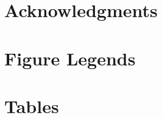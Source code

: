 \documentclass[10pt]{article}
\begin{document}
\section*{Acknowledgments}




\section*{Figure Legends}


\section*{Tables}
\end{document}
